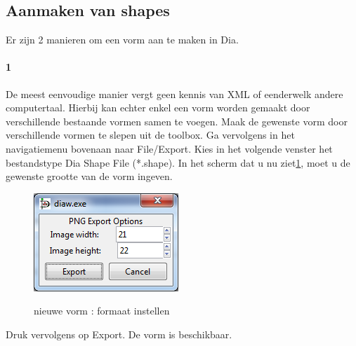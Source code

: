 \documentclass[12pt,a4paper]{report}
\begin{document}
\begin{flushleft}
\subsection{Aanmaken van shapes}
Er zijn 2 manieren om een vorm aan te maken in Dia.
\paragraph*{1}
De meest eenvoudige manier vergt geen kennis van XML of eenderwelk andere computertaal. Hierbij kan echter enkel een vorm worden gemaakt door verschillende bestaande vormen samen te voegen. Maak de gewenste vorm door verschillende vormen te slepen uit de toolbox. Ga vervolgens in het navigatiemenu bovenaan naar File/Export. Kies in het volgende venster het bestandstype Dia Shape File (*.shape). In het scherm dat u nu ziet\ref{shape_01}, moet u de gewenste grootte van de vorm ingeven. 
\begin{figure}[H]
\includegraphics[scale=1]{images/shape_01.png}
\label{shape_01}
\centering
\vspace{-10pt}
\caption{nieuwe vorm : formaat instellen}
\end{figure}
Druk vervolgens op Export. De vorm is beschikbaar.
\pagebreak

\end{flushleft}
\end{document}
